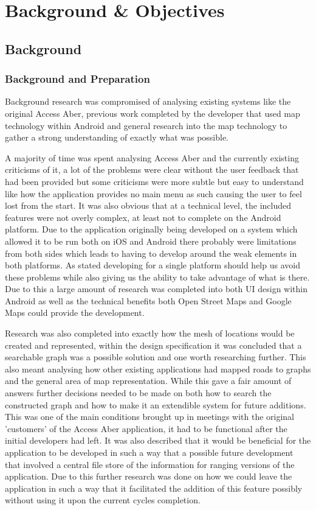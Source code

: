 \chapter{Background \& Objectives}

\section{Background}
\subsection{Background and Preparation}
Background research was compromised of analysing existing systems like the original Access Aber, previous work completed by the developer that used map technology within Android and general research into the map technology to gather a strong understanding of exactly what was possible.

A majority of time was spent analysing Access Aber and the currently existing criticisms of it, a lot of the problems were clear without the user feedback that had been provided but some criticisms were more subtle but easy to understand like how the application provides no main menu as such causing the user to feel lost from the start. It was also obvious that at a technical level, the included features were not overly complex, at least not to complete on the Android platform. Due to the application originally being developed on a system which allowed it to be run both on iOS and Android there probably were limitations from both sides which leads to having to develop around the weak elements in both platforms. As stated developing for a single platform should help us avoid these problems while also giving us the ability to take advantage of what is there. Due to this a large amount of research was completed into both UI design within Android as well as the technical benefits both Open Street Maps and Google Maps could provide the development. 

Research was also completed into exactly how the mesh of locations would be created and represented, within the design specification it was concluded that a searchable graph was a possible solution and one worth researching further. This also meant analysing how other existing applications had mapped roads to graphs and the general area of map representation. While this gave a fair amount of answers further decisions needed to be made on both how to search the constructed graph and how to make it an extendible system for future additions. This was one of the main conditions brought up in meetings with the original 'customers' of the Access Aber application, it had to be functional after the initial developers had left. It was also described that it would be beneficial for the application to be developed in such a way that a possible future development that involved a central file store of the information for ranging versions of the application. Due to this further research was done on how we could leave the application in such a way that it facilitated the addition of this feature possibly without using it upon the current cycles completion. 

